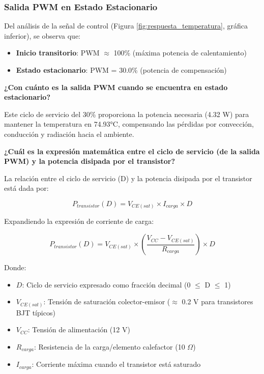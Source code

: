 \subsubsection{Salida PWM en Estado Estacionario}

Del análisis de la señal de control (Figura \ref{fig:respuesta_temperatura}, gráfica inferior), se observa que:

\begin{itemize}
	\item \textbf{Inicio transitorio}: PWM $\approx$ 100\% (máxima potencia de calentamiento)
	\item \textbf{Estado estacionario}: PWM = 30.0\% (potencia de compensación)
\end{itemize}

\textbf{¿Con cuánto es la salida PWM cuando se encuentra en estado estacionario?}

\begin{center}
\end{center}

Este ciclo de servicio del 30\% proporciona la potencia necesaria (4.32 W) para mantener la temperatura en 74.93°C, compensando las pérdidas por convección, conducción y radiación hacia el ambiente.



\textbf{¿Cuál es la expresión matemática entre el ciclo de servicio (de la salida PWM) y la potencia disipada por el transistor?}

La relación entre el ciclo de servicio (D) y la potencia disipada por el transistor está dada por:

\begin{equation}
	\boxed{P_{transistor}(D) = V_{CE(sat)} \times I_{carga} \times D}
\end{equation}

Expandiendo la expresión de corriente de carga:

\begin{equation}
	\boxed{P_{transistor}(D) = V_{CE(sat)} \times \left(\frac{V_{CC} - V_{CE(sat)}}{R_{carga}}\right) \times D}
\end{equation}

Donde:
\begin{itemize}
	\item $D$: Ciclo de servicio expresado como fracción decimal (0 $\leq$ D $\leq$ 1)
	\item $V_{CE(sat)}$: Tensión de saturación colector-emisor ($\approx$ 0.2 V para transistores BJT típicos)
	\item $V_{CC}$: Tensión de alimentación (12 V)
	\item $R_{carga}$: Resistencia de la carga/elemento calefactor (10 $\Omega$)
	\item $I_{carga}$: Corriente máxima cuando el transistor está saturado
\end{itemize}

